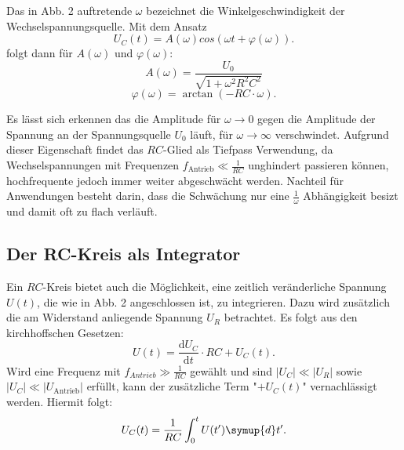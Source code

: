 Das in Abb. 2 auftretende $\omega$ bezeichnet die Winkelgeschwindigkeit der Wechselspannungsquelle.
  Mit dem Ansatz
  \begin{equation}
  U_C(t) = A(\omega)cos(\omega t+\varphi(\omega))\text{.}
  \end{equation}
  folgt dann für $A(\omega)$ und $\varphi(\omega)$:
  \begin{equation}
    A(\omega) = \frac{U_0}{\sqrt{1+\omega^2R^2C^2}}
  \end{equation}
  \begin{equation}
    \varphi(\omega) = \arctan(-RC \cdot \omega)\text{.}
  \end{equation}

Es lässt sich erkennen das die Amplitude für $\omega \to 0$ gegen die Amplitude der Spannung an der Spannungsquelle $U_0$ läuft, für
$\omega \to \infty$ verschwindet. Aufgrund dieser Eigenschaft findet das $RC$-Glied als
 Tiefpass Verwendung, da Wechselspannungen mit Frequenzen $f_{\text{Antrieb}} \ll \frac{1}{RC}$
  unghindert passieren können, hochfrequente jedoch immer weiter abgeschwächt werden.
  Nachteil für Anwendungen besteht darin, dass die Schwächung nur eine $\frac{1}{\omega}$ Abhängigkeit besizt und damit oft zu flach verläuft.

\subsection{Der RC-Kreis als Integrator}

Ein $RC$-Kreis bietet auch die Möglichkeit, eine zeitlich veränderliche Spannung $U(t)$, die
wie in Abb. 2 angeschlossen ist, zu integrieren. Dazu wird zusätzlich die am Widerstand anliegende Spannung $U_R$ betrachtet. Es folgt aus den kirchhoffschen Gesetzen:
\begin{equation}
  U(t) = \frac{\text{d}U_C}{\text{d}t}\cdot RC+U_C(t)\text{.}
\end{equation}
Wird eine Frequenz mit $f_{Antrieb} \gg \frac{1}{RC}$ gewählt und sind
$|U_C| \ll |U_R|$ sowie $|U_C| \ll |U_{\text{Antrieb}}|$ erfüllt, kann der zusätzliche Term "$+ U_C(t)$"
 vernachlässigt werden. Hiermit folgt:
\begin{equation}
U_C(t) = \frac{1}{RC}\int_{0}^{t} U(t') \symup{d}t'\text{.}
\end{equation}
